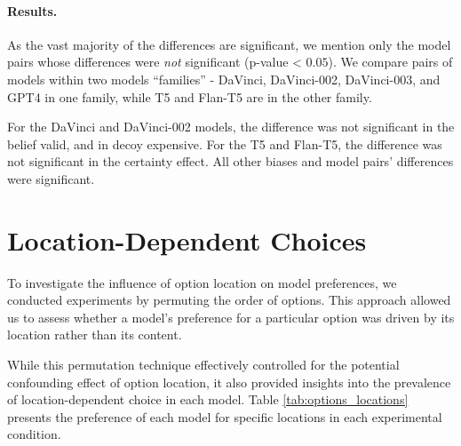 
\paragraph{Results.}
As the vast majority of the differences are significant, we mention only the model pairs whose differences were \emph{not} significant (p-value < $0.05$).
We compare pairs of models within two models ``families'' - DaVinci, DaVinci-002, DaVinci-003, and GPT4 in one family, while T5 and Flan-T5 are in the other family.


For the DaVinci and DaVinci-002 models, the difference was not significant in the belief valid, and in decoy expensive.
For the T5 and Flan-T5, the difference was not significant in the certainty effect. 
All other biases and model pairs' differences were significant.


\section{Location-Dependent Choices}
\label{appendix:sec:options_locations}

To investigate the influence of option location on model preferences, we conducted experiments by permuting the order of options.
This approach allowed us to assess whether a model's preference for a particular option was driven by its location rather than its content.

While this permutation technique effectively controlled for the potential confounding effect of option location, it also provided insights into the prevalence of location-dependent choice in each model.
Table \ref{tab:options_locations} presents the preference of each model for specific locations in each experimental condition.

